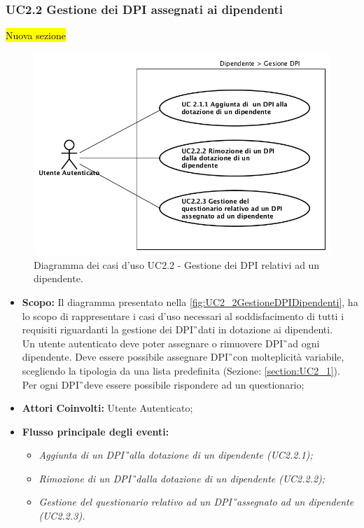 		\subsubsection{UC2.2 Gestione dei DPI assegnati ai dipendenti}
		\hl{Nuova sezione}
			\label{section:UC2_2}
			\begin{figure}[H]
				\begin{center}
					\includegraphics[width=12cm]{Pics/UC2_2DPIDipendenti.png}
					\caption{
						Diagramma dei casi d'uso UC2.2 - Gestione dei DPI relativi ad un dipendente.}
					\label{fig:UC2_2GestioneDPIDipendenti}
				\end{center}
			\end{figure}
			\begin{itemize}
				\item \textbf{Scopo:} Il diagramma presentato nella \autoref{fig:UC2_2GestioneDPIDipendenti}, ha lo scopo di rappresentare i casi d'uso necessari al soddisfacimento di tutti i requisiti riguardanti la gestione dei \gls{DPI}\G\ dati in dotazione ai dipendenti. \\ Un utente autenticato deve poter assegnare o rimuovere \gls{DPI}\G\ ad ogni dipendente. Deve essere possibile assegnare \gls{DPI}\G\ con molteplicità variabile, scegliendo la tipologia da una lista predefinita (Sezione: \ref{section:UC2_1}).\\
				Per ogni \gls{DPI}\G\ deve essere possibile rispondere ad un questionario;
				\item \textbf{Attori Coinvolti:} Utente Autenticato;
				\item \textbf{Flusso principale degli eventi:} 
				\begin{itemize}
					\item \textit{Aggiunta di un \gls{DPI}\G\ alla dotazione di un dipendente (UC2.2.1);}
					\item \textit{Rimozione di un \gls{DPI}\G\ dalla dotazione di un dipendente  (UC2.2.2);}
					\item \textit{Gestione del questionario relativo ad un \gls{DPI}\G\ assegnato ad un dipendente (UC2.2.3).}
				\end{itemize}
			\end{itemize}
